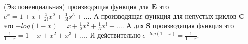\begin{example}
(Экспоненциальная) производящая функция для $\mathbf E$ это $e^x = 1 + x +
\frac{1}{2!}x^2 + \frac{1}{3!}x^3 + \dots$. А производящая функция для
непустых циклов $\mathbf C$ это $-log(1-x) = x + \frac{1}{2}x^2 +
\frac{1}{3}x^3 + \dots$.
А для $\mathbf S$ производящая функция это $\frac{1}{1-x} = 1 + x + x^2 + x^3 +
\dots$.
И действительно $e^{-log(1-x)} = \frac{1}{1-x}$.
\end{example}
